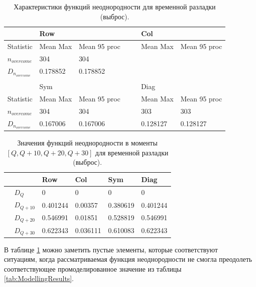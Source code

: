 \documentclass[specialist, substylefile = spbu.rtx,
			   subf, href, 12pt]{disser}
\begin{document}
\begin{table}[!hhh]
	\center
	\caption{Характеристики функций неоднородности для временной разладки (выброс).}
	\begin{tabular}{l|lll|lll}
		 				   & Row		  	  & 			 &&  & Col		      & 			      \\
		 				   \hline
		 Statistic        & Mean Max 	  & Mean 95 proc && 	& Mean Max     & Mean 95 proc     \\
		 $n_{overcome}$   & 304   	  & 304      &&     &        &  		  \\
		 $D_{n_{overcome}}$& 0.178852		  &	0.178852	 &&     & 		  &               \\
		 &&&&&& \\
		 				   & Sym		  	  & 			 && & Diag		      & 			      \\
		 				   \hline
		 Statistic        & Mean Max 	  & Mean 95 proc && 	& Mean Max     & Mean 95 proc     \\
		 $n_{overcome}$   & 304   	  & 304      &&     & 303      & 303		  \\
		$D_{n_{overcome}}$& 0.167006		  &	0.167006		 &&     & 0.128127		 & 0.128127             \\
	\end{tabular}
	\label{tab:TemporaryHeterogeneityOutlier}
\end{table}


\begin{table}[!hhh]
	\center
	\caption{Значения функций неоднородности в моменты $ [Q, Q+10, Q+20, Q+30] $ для временной разладки (выброс). }
	\begin{tabular}{ll|llll}
		&              & Row 	  & Col 	& Sym    & Diag  \\
		\hline
		& $D_Q$        & 0	  & 0 	& 0 & 0		\\
		& $D_{Q+10}$   & 0.401244   & 0.00357  & 0.380619 & 0.401244	\\
		& $D_{Q+20}$   & 0.546991   & 0.01851  & 0.528819 & 0.546991	\\
		& $D_{Q+30}$   & 0.622343	  &	0.036111 & 0.610083 & 0.622343	
	\end{tabular}
	\label{tab:TemporaryHeterogeneityOutlierValues}
\end{table}

В таблице \ref{tab:TemporaryHeterogeneityOutlier} можно заметить пустые элементы, которые соответствуют ситуациям, когда рассматриваемая функция неоднородности не смогла преодолеть соответствующее промоделированное значение из таблицы \ref{tab:ModellingResults}.
\end{document}
